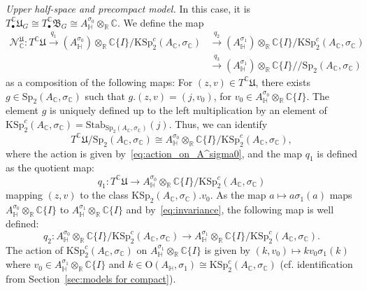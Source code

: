 \documentclass[oneside,11pt]{amsart}
\theoremstyle{definition}
\theoremstyle{remark}
\numberwithin{thm}{section}
\numberwithin{equation}{section}
\begin{document}
\vspace{2mm}

\noindent \textit{Upper half-space and precompact model.} In this case, it is 
$T^{\mathbb{C}}_\bullet\mathfrak{U}_G \cong  T^{\mathbb{C}}_\bullet\mathfrak{B}_G \cong  A_{\mathbb{H}}^{\sigma_0} \otimes_{\mathbb{R}} \mathbb{C}.$ We define the map 
\begin{align*}
\mathcal N_\mathbb C^{\mathfrak U}\colon T^{\mathbb{C}}\mathfrak{U}\xrightarrow{q_1} (A_\mathbb H^{\sigma_0})\otimes_\mathbb R\mathbb C\{I\}/\mathrm{KSp}^c_2(A_\mathbb C,\sigma_\mathbb C) & \xrightarrow{q_2} (A_\mathbb H^{\sigma_1})\otimes_\mathbb R\mathbb C\{I\}/\mathrm{KSp}^c_2(A_\mathbb C,\sigma_\mathbb C) \\ & \xrightarrow{q_3}(A_\mathbb H^{\sigma_1})\otimes_\mathbb R\mathbb C\{I\}/\!\!/\mathrm{Sp}_2(A_\mathbb C,\sigma_\mathbb C)
\end{align*}
as a composition of the following maps: For $(z,v)\in T^{\mathbb{C}}\mathfrak{U}$, there exists $g\in\mathrm{Sp}_2(A_\mathbb C,\sigma_\mathbb C)$ such that $g.(z,v)= (j,v_0)$, for $v_0\in A_\mathbb{H}^{\sigma_0} \otimes_{\mathbb{R}} \mathbb{C}\{I\}$. The element $g$ is uniquely defined up to the left multiplication by an element of $\mathrm{KSp}^c_2(A_\mathbb C,\sigma_\mathbb C)=\mathrm{Stab}_{\mathrm{Sp}_2(A_\mathbb C,\sigma_\mathbb C)}(j)$. Thus, we can identify 
$$T^{\mathbb{C}}\mathfrak{U}/\mathrm{Sp}_2(A_\mathbb C,\sigma_\mathbb C)\cong A_\mathbb{H}^{\sigma_0} \otimes_{\mathbb{R}} \mathbb{C}\{I\}/\mathrm{KSp}^c_2(A_\mathbb C,\sigma_\mathbb C),$$
where the action is given by~\eqref{eq:action_on_A^sigma0}, and the map $q_1$ is defined as the quotient map:
$$q_1\colon T^{\mathbb{C}}\mathfrak{U}\to A_\mathbb{H}^{\sigma_0} \otimes_{\mathbb{R}} \mathbb{C}\{I\}/\mathrm{KSp}^c_2(A_\mathbb C,\sigma_\mathbb C)$$
mapping $(z,v)$ to the class $\mathrm{KSp}_2(A_\mathbb C,\sigma_\mathbb C).v_0$. As the map $a\mapsto a\sigma_1(a)$ maps $A_\mathbb{H}^{\sigma_0} \otimes_{\mathbb{R}} \mathbb{C}\{I\}$ to $A_\mathbb{H}^{\sigma_1} \otimes_{\mathbb{R}} \mathbb{C}\{I\}$ and by~\eqref{eq:invariance}, the following map is well defined:
$$q_2\colon A_\mathbb{H}^{\sigma_0} \otimes_{\mathbb{R}} \mathbb{C}\{I\}/\mathrm{KSp}^c_2(A_\mathbb C,\sigma_\mathbb C)\to A_\mathbb{H}^{\sigma_1} \otimes_{\mathbb{R}} \mathbb{C}\{I\}/\mathrm{KSp}^c_2(A_\mathbb C,\sigma_\mathbb C).$$
The action of $\mathrm{KSp}^c_2(A_\mathbb C,\sigma_\mathbb C)$ on $A_\mathbb{H}^{\sigma_1} \otimes_{\mathbb{R}} \mathbb{C}\{I\}$ is given by $(k,v_0)\mapsto kv_0\sigma_1(k)$ where $v_0\in A_\mathbb{H}^{\sigma_1} \otimes_{\mathbb{R}} \mathbb{C}\{I\}$ and $k\in \mathrm{O}(A_\mathbb H,\sigma_1)\cong \mathrm{KSp}^c_2(A_\mathbb C,\sigma_\mathbb C)$ (cf. identification from Section~\ref{sec:models for compact}).
\end{document}
